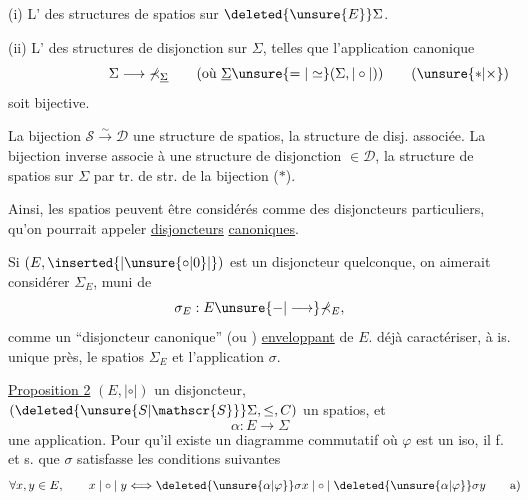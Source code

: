 (i) L'  des structures de spatios  sur $\deleted{\unsure{E}}\Sigma$.

(ii) L'  des structures de disjonction \inserted{$\mathrel{|\circ|}$} sur $\Sigma$, telles que l'application canonique
\[
\Sigma\longrightarrow\mathbb{\Sigma}_{\underline{\Sigma}}\qquad
(\text{où }\underline{\Sigma}\unsure{=|\simeq}(\Sigma,\mathrel{|\circ|}))
\tag*{\makebox[0pt][r]{\makebox[\displaywidth][l]{($\unsure{\ast|\times}$)}}}
\]
soit bijective.

 La bijection $\mathscr{S}\overset{\sim}{\longrightarrow}\mathscr{D}$    une structure de spatios, la structure de disj. associée. La bijection inverse associe à une structure de disjonction $\in\mathscr{D}$, la structure de spatios sur $\Sigma$  par tr. de str. de la bijection ($\ast$).

Ainsi, les spatios peuvent être considérés comme des disjoncteurs particuliers, qu'on pourrait appeler \uline{disjoncteurs} \uline{canoniques}. 

Si $(E,\inserted{\mathrel{|\unsure{\circ|0}|}})$ est un disjoncteur quelconque, on aimerait considérer $ \mathbb{\Sigma}_{E}$, muni de
\[
\sigma_{E}:E\unsure{-|\longrightarrow}\mathbb{\Sigma}_{E},
\]
comme un ``disjoncteur canonique'' (ou ) \uline{enveloppant} de $E$.  déjà caractériser, à is. unique près, le spatios $\mathbb{\Sigma}_{E}$ et l'application $\sigma$.

\uline{Proposition 2}  $(E,\mathrel{|\circ|})$ un disjoncteur, $(\deleted{\unsure{S|\mathscr{S}}}\Sigma,\leq,C)$ un spatios, et
\[
\alpha:E\longrightarrow\Sigma
\]
une application. Pour qu'il existe un diagramme commutatif
où $\varphi$ est un iso, il f. et s. que $\sigma$ satisfasse les  conditions suivantes
\[
\forall x,y\in E,\qquad x\mathrel{|\circ|}y\Longleftrightarrow
\deleted{\unsure{\alpha|\varphi}}\sigma x\mathrel{|\circ|}\deleted{\unsure{\alpha|\varphi}}\sigma y
\tag*{\makebox[0pt][r]{\makebox[\displaywidth][l]{a)}}}
\]

